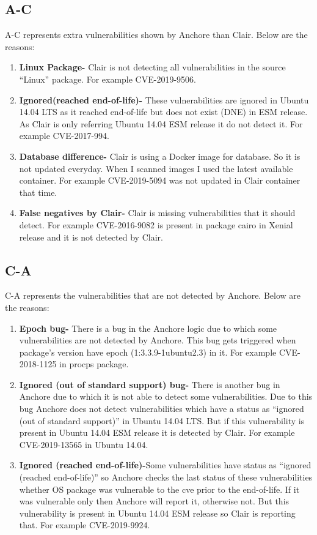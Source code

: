 \documentclass[a4paper,num-refs]{oup-contemporary}
\begin{document}
\subsection{A-C}

A-C represents extra vulnerabilities shown by Anchore than Clair. Below are the reasons:
\begin{enumerate}
	\item\textbf{Linux Package-} Clair is not detecting all vulnerabilities in the source “Linux” package. 
		For example CVE-2019-9506.
	\item\textbf{Ignored(reached end-of-life)-} These vulnerabilities are ignored in Ubuntu 14.04 LTS as it 
		reached end-of-life but does not exist (DNE) in ESM release. As Clair is only referring 
		Ubuntu 14.04 ESM release it do not detect it. For example CVE-2017-994.
	\item\textbf{Database difference-} Clair is using a Docker image for database. So it is not updated everyday. 
		When I scanned images I used the latest available container. For example CVE-2019-5094 was not 
		updated in Clair container that time.
	\item\textbf{False negatives by Clair-} Clair is missing vulnerabilities that it should detect. For example 
		CVE-2016-9082 is present in package cairo in Xenial release and it is not detected by Clair.
\end{enumerate}

\subsection{C-A}
C-A represents the vulnerabilities that are not detected by Anchore. Below are the reasons:
\begin{enumerate}

	\item\textbf{Epoch bug-} There is a bug in the Anchore logic due to which some vulnerabilities are 
		not detected by Anchore. This bug gets triggered when package’s version have epoch 
		(1:3.3.9-1ubuntu2.3)  in it. For example CVE-2018-1125 in procps package.
	\item\textbf{Ignored (out of standard support) bug-} There is another bug in Anchore due to 
		which it is not able to detect some vulnerabilities. Due to this bug Anchore does not detect 
		vulnerabilities which have a status as “ignored (out of standard support)” in Ubuntu 14.04 LTS. 
		But if this vulnerability is present in Ubuntu 14.04 ESM release it is detected by Clair. 
		For example CVE-2019-13565 in Ubuntu 14.04.
	\item\textbf{Ignored (reached end-of-life)-}Some vulnerabilities have status as “ignored (reached end-of-life)” 
		so Anchore checks the last status of these vulnerabilities whether OS package was vulnerable to the cve 
		prior to the end-of-life. If it was vulnerable only then Anchore will report it, otherwise not. But this 
		vulnerability is present in Ubuntu 14.04 ESM release so Clair is reporting that. For example CVE-2019-9924.
\end{enumerate}
\end{document}
